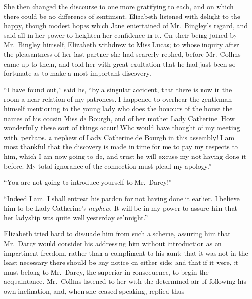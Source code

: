 \documentclass[12pt,english,oneside]{book}
\begin{document}
She then changed the discourse to one more gratifying to each, and
on which there could be no difference of sentiment. Elizabeth listened
with delight to the happy, though modest hopes which Jane entertained
of Mr.\ Bingley's regard, and said all in her power to heighten her
confidence in it. On their being joined by Mr.\ Bingley himself,
Elizabeth withdrew to Miss Lucas; to whose inquiry after the pleasantness
of her last partner she had scarcely replied, before Mr.\ Collins
came up to them, and told her with great exultation that he had just
been so fortunate as to make a most important discovery.

{}``I have found out,'' said he, {}``by a singular accident, that
there is now in the room a near relation of my patroness. I happened
to overhear the gentleman himself mentioning to the young lady who
does the honours of the house the names of his cousin Miss de Bourgh,
and of her mother Lady Catherine. How wonderfully these sort of things
occur! Who would have thought of my meeting with, perhaps, a nephew
of Lady Catherine de Bourgh in this assembly! I am most thankful that
the discovery is made in time for me to pay my respects to him, which
I am now going to do, and trust he will excuse my not having done
it before. My total ignorance of the connection must plead my apology.''

{}``You are not going to introduce yourself to Mr.\ Darcy!''\


{}``Indeed I am. I shall entreat his pardon for not having done it
earlier. I believe him to be Lady Catherine's \textit{nephew}. It
will be in my power to assure him that her ladyship was quite well
yesterday se'nnight.''

Elizabeth tried hard to dissuade him from such a scheme, assuring
him that Mr.\ Darcy would consider his addressing him without introduction
as an impertinent freedom, rather than a compliment to his aunt; that
it was not in the least necessary there should be any notice on either
side; and that if it were, it must belong to Mr.\ Darcy, the superior
in consequence, to begin the acquaintance. Mr.\ Collins listened
to her with the determined air of following his own inclination, and,
when she ceased speaking, replied thus:
\end{document}
